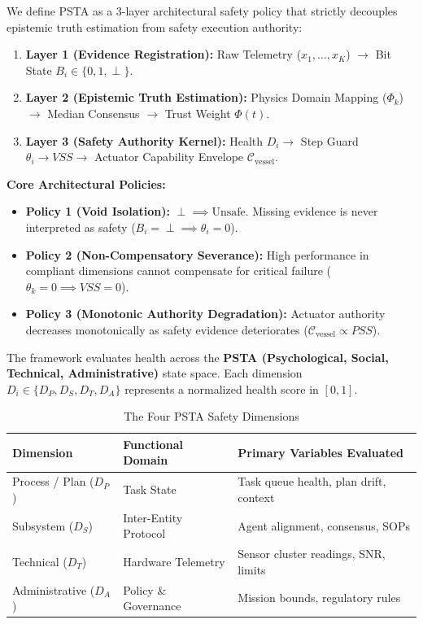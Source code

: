 \documentclass[conference]{IEEEtran}
\begin{document}
We define PSTA as a 3-layer architectural safety policy that strictly decouples epistemic truth estimation from safety execution authority:
\begin{enumerate}
    \item \textbf{Layer 1 (Evidence Registration):} Raw Telemetry ($x_1, \dots, x_K$) $\to$ Bit State $B_i \in \{0, 1, \perp\}$.
    \item \textbf{Layer 2 (Epistemic Truth Estimation):} Physics Domain Mapping ($\Phi_k$) $\to$ Median Consensus $\to$ Trust Weight $\Phi(t)$.
    \item \textbf{Layer 3 (Safety Authority Kernel):} Health $D_i \to$ Step Guard $\theta_i \to VSS \to$ Actuator Capability Envelope $\mathcal{C}_{\text{vessel}}$.
\end{enumerate}

\textbf{Core Architectural Policies:}
\begin{itemize}
    \item \textbf{Policy 1 (Void Isolation):} $\boxed{\perp \implies \text{Unsafe}}$. Missing evidence is never interpreted as safety ($B_i = \perp \implies \theta_i = 0$).
    \item \textbf{Policy 2 (Non-Compensatory Severance):} High performance in compliant dimensions cannot compensate for critical failure ($\theta_k = 0 \implies VSS = 0$).
    \item \textbf{Policy 3 (Monotonic Authority Degradation):} Actuator authority decreases monotonically as safety evidence deteriorates ($\mathcal{C}_{\text{vessel}} \propto PSS$).
\end{itemize}

The framework evaluates health across the \textbf{PSTA (Psychological, Social, Technical, Administrative)} state space. Each dimension $D_i \in \{D_P, D_S, D_T, D_A\}$ represents a normalized health score in $[0, 1]$.

\begin{table}[htbp]
\caption{The Four PSTA Safety Dimensions}
\begin{center}
\begin{tabular}{lll}
\toprule
\textbf{Dimension} & \textbf{Functional Domain} & \textbf{Primary Variables Evaluated} \\
\midrule
Process / Plan ($D_P$) & Task State & Task queue health, plan drift, context \\
Subsystem ($D_S$) & Inter-Entity Protocol & Agent alignment, consensus, SOPs \\
Technical ($D_T$) & Hardware Telemetry & Sensor cluster readings, SNR, limits \\
Administrative ($D_A$) & Policy \& Governance & Mission bounds, regulatory rules \\
\bottomrule
\end{tabular}
\label{tab:psta_dimensions}
\end{center}
\end{table}
\end{document}
